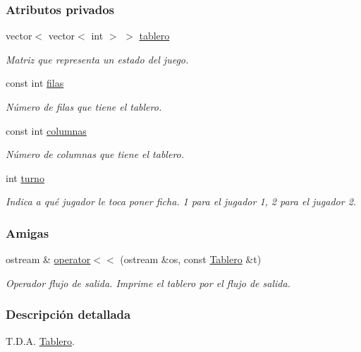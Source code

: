 \subsubsection*{Atributos privados}
\begin{DoxyCompactItemize}
\item 
vector$<$ vector$<$ int $>$ $>$ \hyperlink{classTablero_a5df607d108c0c0a14aa4f393b7f43030}{tablero}
\begin{DoxyCompactList}\small\item\em Matriz que representa un estado del juego. \end{DoxyCompactList}\item 
const int \hyperlink{classTablero_a6b1f04a8502106c33bf5469f791320e6}{filas}
\begin{DoxyCompactList}\small\item\em Número de filas que tiene el tablero. \end{DoxyCompactList}\item 
const int \hyperlink{classTablero_ac70289ec91b44d05da648770cc46801d}{columnas}
\begin{DoxyCompactList}\small\item\em Número de columnas que tiene el tablero. \end{DoxyCompactList}\item 
int \hyperlink{classTablero_ae460b4a3245da075dd381365abf158bc}{turno}
\begin{DoxyCompactList}\small\item\em Indica a qué jugador le toca poner ficha. 1 para el jugador 1, 2 para el jugador 2. \end{DoxyCompactList}\end{DoxyCompactItemize}
\subsubsection*{Amigas}
\begin{DoxyCompactItemize}
\item 
ostream \& \hyperlink{classTablero_a320d149883604290d56f857c9b5bcf1d}{operator$<$$<$} (ostream \&os, const \hyperlink{classTablero}{Tablero} \&t)
\begin{DoxyCompactList}\small\item\em Operador flujo de salida. Imprime el tablero por el flujo de salida. \end{DoxyCompactList}\end{DoxyCompactItemize}


\subsubsection{Descripción detallada}
T.\-D.\-A. \hyperlink{classTablero}{Tablero}. 

